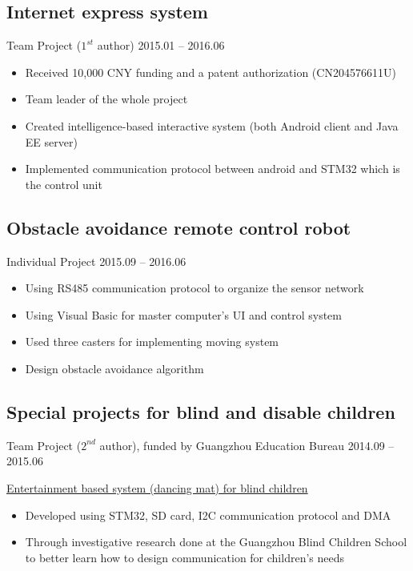 \documentclass[11pt,a4paper,sans]{moderncv}
\begin{document}
\subsection{Internet express system}
Team Project ($1^{st}$ author) \hfill 2015.01 -- 2016.06
\vspace{4pt}
\begin{itemize}
\item Received 10,000 CNY funding and a patent authorization (CN204576611U)
\item Team leader of the whole project
\item Created intelligence-based interactive system (both Android client and Java EE server)
\item Implemented communication protocol between android and STM32 which is the control unit
\end{itemize}

\subsection{Obstacle avoidance remote control robot}
Individual Project \hfill 2015.09 -- 2016.06
\vspace{4pt}
\begin{itemize}
\item Using RS485 communication protocol to organize the sensor network
\item Using Visual Basic for master computer's UI and control system
\item Used three casters for implementing moving system
\item Design obstacle avoidance algorithm
\end{itemize}

\subsection{Special projects for blind and disable children}
Team Project ($2^{nd}$ author), funded by Guangzhou Education Bureau \hfill 2014.09 -- 2015.06

\vspace{1em}
\underline{Entertainment based system (dancing mat) for blind children}
\vspace{4pt}
\begin{itemize}
\item Developed using STM32, SD card, I2C communication protocol and DMA
\item Through investigative research done at the Guangzhou Blind Children School to better learn how to design communication for children's needs
\end{itemize}
\end{document}
